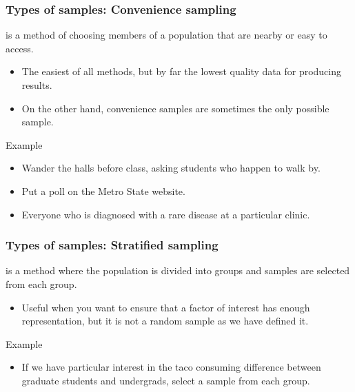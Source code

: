 \documentclass[xcolor=table, aspectratio=169, bigger]{beamer}
\begin{document}
\begin{frame}
\frametitle{Types of samples: Convenience sampling}

\begin{block}{}
 is a method of choosing members of a population that are nearby or easy to access.
\begin{itemize}
\item The easiest of all methods, but by far the lowest quality data for producing results.
\item On the other hand, convenience samples are sometimes the only possible sample.
\end{itemize}
\end{block}
\pause
\begin{exampleblock}{Example}
\begin{itemize}
\item Wander the halls before class, asking students who happen to walk by.
\item Put a poll on the Metro State website.
\item Everyone who is diagnosed with a rare disease at a particular clinic.
\end{itemize}

\end{exampleblock}
\end{frame}

\begin{frame}
\frametitle{Types of samples: Stratified sampling}

\begin{block}{}
 is a method where the population is divided into groups and samples are selected from each group.
\begin{itemize}
\item Useful when you want to ensure that a factor of interest has enough representation, but it is not a random sample as we have defined it.
\end{itemize}
\end{block}
\pause
\begin{exampleblock}{Example}
\begin{itemize}
\item If we have particular interest in the taco consuming difference between graduate students and undergrads, select a sample from each group.
\end{itemize}
\end{exampleblock}
\end{frame}
\end{document}
